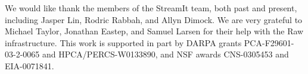 \acks 
We would like thank the members of the StreamIt team, both past and
present, including Jasper Lin, Rodric Rabbah, and Allyn Dimock.  We
are very grateful to Michael Taylor, Jonathan Eastep, and Samuel
Larsen for their help with the Raw infrastructure. This work is
supported in part by DARPA grants PCA-F29601-03-2-0065 and
HPCA/PERCS-W0133890, and NSF awards CNS-0305453 and EIA-0071841.
